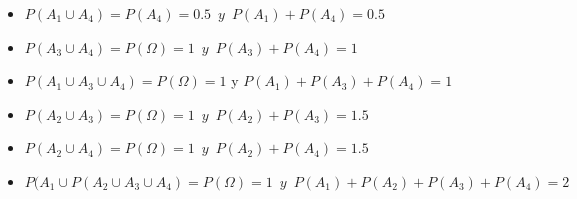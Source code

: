 \documentclass[11pt,fleqn]{book} %
\numberwithin{equation}{section} %
\numberwithin{figure}{section} %
\numberwithin{table}{section} %
\begin{document}
\begin{itemize}
    \item $P(A_{1}\cup A_{4}) = P(A_{4})=0.5 \enspace y \enspace P(A_{1})+P(A_{4})=0.5$
\end{itemize}
\begin{itemize}
    \item $P(A_{3}\cup A_{4}) = P(\Omega)=1 \enspace y \enspace P(A_{3})+P(A_{4})=1$
\end{itemize}
\begin{itemize}
    \item $P(A_{1} \cup A_{3} \cup A_{4}) = P(\Omega)=1$ \enspace y \enspace $P(A_{1})+P(A_{3})+P(A_{4})=1$
\end{itemize}
\begin{itemize}
    \item $P(A_{2} \cup A_{3}) = P(\Omega)=1 \enspace y \enspace P(A_{2})+P(A_{3})=1.5$
\end{itemize}
\begin{itemize}
    \item $P(A_{2} \cup A_{4}) = P(\Omega)=1 \enspace y \enspace P(A_{2})+P(A_{4})=1.5$
\end{itemize}
\begin{itemize}
    \item $P(A_{1} \cup P(A_{2} \cup A_{3} \cup A_{4}) = P(\Omega)=1 \enspace y \enspace P(A_{1})+P(A_{2})+P(A_{3})+P(A_{4})=2$
\end{itemize}
\end{document}
